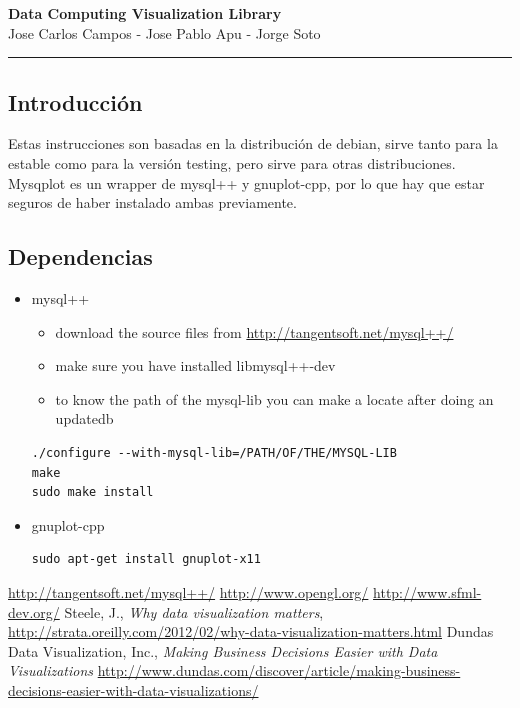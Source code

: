 \documentclass[11pt]{article}
\begin{document}
\begin{center}
{ \huge \bfseries Data Computing Visualization Library }\\[0.2cm]
{ Jose Carlos Campos - Jose Pablo Apu - Jorge Soto }\\[0.2cm]
\rule{\linewidth}{0.25mm}
\end{center}

\subsection*{Introducción}
Estas instrucciones son basadas en la distribución de debian, sirve tanto para la estable como para la versión testing, pero sirve para otras distribuciones. Mysqplot es un wrapper de mysql++ y gnuplot-cpp, por lo que hay que estar seguros de haber instalado ambas previamente. 

\subsection*{Dependencias}
\begin{itemize}
\item mysql++\\
\begin{itemize}
\item download the source files from \url{http://tangentsoft.net/mysql++/}
\item make sure you have installed libmysql++-dev
\item to know the path of the mysql-lib you can make a locate after doing an updatedb
\end{itemize}
\begin{lstlisting}
./configure --with-mysql-lib=/PATH/OF/THE/MYSQL-LIB
make
sudo make install
\end{lstlisting}
\item gnuplot-cpp\\

\begin{lstlisting}
sudo apt-get install gnuplot-x11
\end{lstlisting}
\end{itemize}
\begin{thebibliography}{10}
\url{http://tangentsoft.net/mysql++/}
\url{http://www.opengl.org/}
\url{http://www.sfml-dev.org/}
Steele, J., \textit{Why data visualization matters}, 
		\url{http://strata.oreilly.com/2012/02/why-data-visualization-matters.html}
Dundas Data Visualization, Inc., \textit{Making Business Decisions Easier with Data Visualizations}
		\url{http://www.dundas.com/discover/article/making-business-decisions-easier-with-data-visualizations/}
\end{thebibliography}
\end{document}
